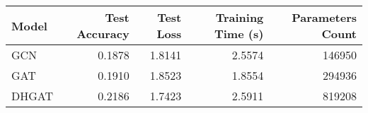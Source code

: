 \begin{tabular}{lrrrr}
\toprule
Model & Test Accuracy & Test Loss & Training Time (s) & Parameters Count \\
\midrule
GCN & 0.1878 & 1.8141 & 2.5574 & 146950 \\
GAT & 0.1910 & 1.8523 & 1.8554 & 294936 \\
DHGAT & 0.2186 & 1.7423 & 2.5911 & 819208 \\
\bottomrule
\end{tabular}

